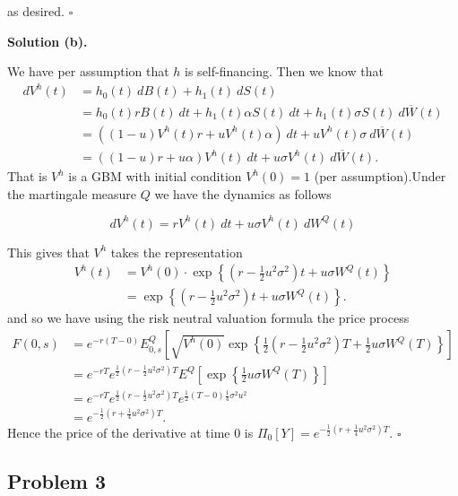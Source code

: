\documentclass[a4paper,12pt,openany]{book}
\begin{document}
as desired. \(\square\)

\noindent\makebox[\linewidth]{\rule{\textwidth}{0.4pt}}

\textbf{Solution (b).}

We have per assumption that \(h\) is self-financing. Then we know that
\begin{align*}
dV^h(t)&=h_0(t)\ dB(t)+h_1(t)\ dS(t)\\
&=h_0(t)rB(t)\ dt+h_1(t)\alpha S(t)\ dt+h_1(t)\sigma S(t)\ d\overline{W}(t)\\
&=\left((1-u)V^h(t) r+uV^h(t)\alpha\right)\ dt+uV^h(t)\sigma\ d\overline{W}(t)\\
&=\left((1-u) r+u\alpha\right)V^h(t)\ dt+u\sigma V^h(t)\ d\overline{W}(t).
\end{align*}
That is \(V^h\) is a GBM with initial condition \(V^h(0)=1\) (per assumption).Under the martingale measure \(Q\) we have the dynamics as follows

\[
dV^h(t)=rV^h(t)\ dt+u\sigma V^h(t)\ dW^Q(t)
\]

This gives that \(V^h\) takes the representation
\begin{align*}
V^h(t)&=V^h(0)\cdot\exp\left\{\left( r-\frac{1}{2}u^2\sigma^2\right)t+u\sigma W^Q(t)\right\}\\
&=\exp\left\{\left( r-\frac{1}{2}u^2\sigma^2\right)t+u\sigma W^Q(t)\right\}.
\end{align*}
and so we have using the risk neutral valuation formula the price process
\begin{align*}
F(0,s)&=e^{-r(T-0)}E^Q_{0,s}\left[\sqrt{V^h(0)}\exp\left\{\frac{1}{2}\left( r-\frac{1}{2}u^2\sigma^2\right)T+\frac{1}{2}u\sigma W^Q(T)\right\}\right]\\
&=e^{-rT}e^{\frac{1}{2}\left( r-\frac{1}{2}u^2\sigma^2\right)T}E^Q\left[\exp\left\{\frac{1}{2}u\sigma W^Q(T)\right\}\right]\\
&=e^{-rT}e^{\frac{1}{2}\left( r-\frac{1}{2}u^2\sigma^2\right)T}e^{\frac{1}{2}(T-0)\frac{1}{4}\sigma^2 u^2}\\
&=e^{-\frac{1}{2}\left( r+\frac{1}{4}u^2\sigma^2\right)T}.
\end{align*}
Hence the price of the derivative at time 0 is \(\Pi_0[Y]=e^{-\frac{1}{2}\left( r+\frac{1}{4}u^2\sigma^2\right)T}\). \(\square\)

\noindent\makebox[\linewidth]{\rule{\textwidth}{0.4pt}}

\hypertarget{problem-3-2}{%
\subsection{Problem 3}\label{problem-3-2}}
\end{document}
